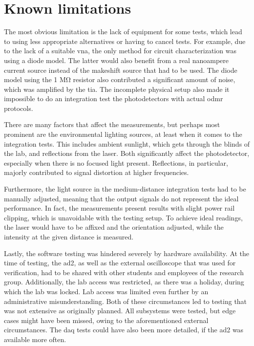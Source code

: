 \section{Known limitations}
The most obvious limitation is the lack of equipment for some tests, which lead to using less appropriate alternatives or having to cancel tests. For example, due to the lack of a suitable \gls{vna}, the only method for circuit characterization was using a diode model. The latter would also benefit from a real nanoampere current source instead of the makeshift source that had to be used. The diode model using the 1 \unit{\mega\ohm} resistor also contributed a significant amount of noise, which was amplified by the \gls{tia}. The incomplete physical setup also made it impossible to do an integration test the photodetectors with actual \gls{odmr} protocols. 

There are many factors that affect the measurements, but perhaps most prominent are the environmental lighting sources, at least when it comes to the integration tests. This includes ambient sunlight, which gets through the blinds of the lab, and reflections from the laser. Both significantly affect the photodetector, especially when there is no focused light present. Reflections, in particular, majorly contributed to signal distortion at higher frequencies.

Furthermore, the light source in the medium-distance integration tests had to be manually adjusted, meaning that the output signals do not represent the ideal performance. In fact, the measurements present results with slight power rail clipping, which is unavoidable with the testing setup. To achieve ideal readings, the laser would have to be affixed and the orientation adjusted, while the intensity at the given distance is measured.

Lastly, the software testing was hindered severely by hardware availability. At the time of testing, the \gls{ad2}, as well as the external oscilloscope that was used for verification, had to be shared with other students and employees of the research group. Additionally, the lab access was restricted, as there was a holiday, during which the lab was locked. Lab access was limited even further by an administrative misunderstanding. Both of these circumstances led to testing that was not extensive as originally planned. All subsystems were tested, but edge cases might have been missed, owing to the aforementioned external circumstances. The \gls{daq} tests could have also been more detailed, if the \gls{ad2} was available more often.


